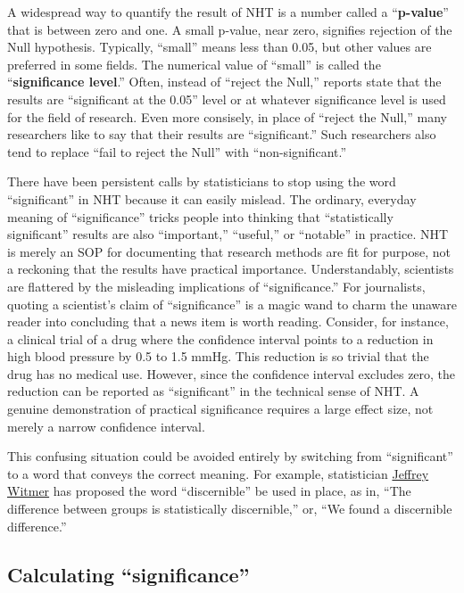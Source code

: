 \documentclass[
  letterpaper,
  DIV=11,
  numbers=noendperiod,
  oneside]{scrartcl}
\begin{document}
A widespread way to quantify the result of NHT is a number called a
``\textbf{p-value}'' that is between zero and one. A small p-value, near
zero, signifies rejection of the Null hypothesis. Typically, ``small''
means less than 0.05, but other values are preferred in some fields. The
numerical value of ``small'' is called the ``\textbf{significance
level}.'' Often, instead of ``reject the Null,'' reports state that the
results are ``significant at the 0.05'' level or at whatever
significance level is used for the field of research. Even more
consisely, in place of ``reject the Null,'' many researchers like to say
that their results are ``significant.'' Such researchers also tend to
replace ``fail to reject the Null'' with ``non-significant.''

There have been persistent calls by statisticians to stop using the word
``significant'' in NHT because it can easily mislead. The ordinary,
everyday meaning of ``significance'' tricks people into thinking that
``statistically significant'' results are also ``important,''
``useful,'' or ``notable'' in practice. NHT is merely an SOP for
documenting that research methods are fit for purpose, not a reckoning
that the results have practical importance. Understandably, scientists
are flattered by the misleading implications of ``significance.'' For
journalists, quoting a scientist's claim of ``significance'' is a magic
wand to charm the unaware reader into concluding that a news item is
worth reading. Consider, for instance, a clinical trial of a drug where
the confidence interval points to a reduction in high blood pressure by
0.5 to 1.5 mmHg. This reduction is so trivial that the drug has no
medical use. However, since the confidence interval excludes zero, the
reduction can be reported as ``significant'' in the technical sense of
NHT. A genuine demonstration of practical significance requires a large
effect size, not merely a narrow confidence interval.

This confusing situation could be avoided entirely by switching from
``significant'' to a word that conveys the correct meaning. For example,
statistician
\href{https://www.tandfonline.com/doi/full/10.1080/10691898.2019.1702415}{Jeffrey
Witmer} has proposed the word ``discernible'' be used in place, as in,
``The difference between groups is statistically discernible,'' or, ``We
found a discernible difference.''

\subsection{Calculating
``significance''}\label{calculating-significance}
\end{document}
